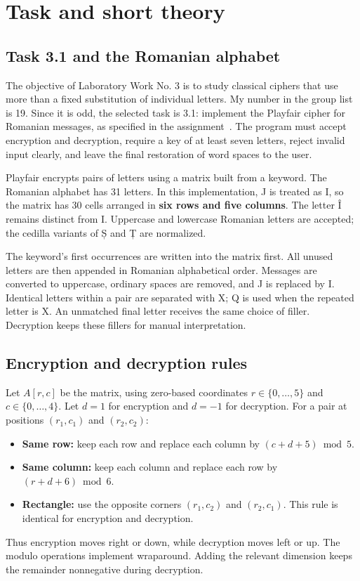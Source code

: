 \documentclass{tum_report}
\begin{document}

\clearpage
{}
\tableofcontents
\thispagestyle{empty}
\clearpage
\pagestyle{fancy}

\chapter{Task and short theory}
\section{Task 3.1 and the Romanian alphabet}
The objective of Laboratory Work No. 3 is to study classical ciphers that
use more than a fixed substitution of individual letters. My number in the
group list is 19. Since it is odd, the selected task is 3.1: implement the
Playfair cipher for Romanian messages, as specified in the assignment~\cite{ref:assignment}.
The program must accept encryption and decryption, require a key of at
least seven letters, reject invalid input clearly, and leave the final
restoration of word spaces to the user.

Playfair encrypts pairs of letters using a matrix built from a keyword.
The Romanian alphabet has 31 letters. In this implementation, J is treated
as I, so the matrix has 30 cells arranged in \textbf{six rows and five columns}.
The letter Î remains distinct from I. Uppercase and lowercase Romanian
letters are accepted; the cedilla variants of Ș and Ț are normalized.

The keyword's first occurrences are written into the matrix first. All
unused letters are then appended in Romanian alphabetical order. Messages
are converted to uppercase, ordinary spaces are removed, and J is replaced
by I. Identical letters within a pair are separated with X; Q is used
when the repeated letter is X. An unmatched final letter receives the
same choice of filler. Decryption keeps these fillers for manual interpretation.

\section{Encryption and decryption rules}
Let $A[r,c]$ be the matrix, using zero-based coordinates
$r\in\{0,\ldots,5\}$ and $c\in\{0,\ldots,4\}$. Let $d=1$ for encryption
and $d=-1$ for decryption. For a pair at positions $(r_1,c_1)$ and $(r_2,c_2)$:
\begin{itemize}
\item \textbf{Same row:} keep each row and replace each column by
      $(c+d+5)\bmod5$.
\item \textbf{Same column:} keep each column and replace each row by
      $(r+d+6)\bmod6$.
\item \textbf{Rectangle:} use the opposite corners $(r_1,c_2)$ and $(r_2,c_1)$.
      This rule is identical for encryption and decryption.
\end{itemize}
Thus encryption moves right or down, while decryption moves left or up.
The modulo operations implement wraparound. Adding the relevant dimension
keeps the remainder nonnegative during decryption.
\end{document}
